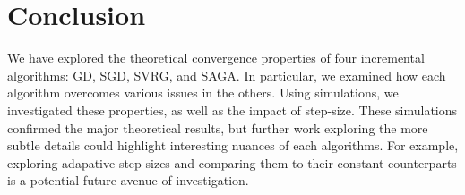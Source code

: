 \section{Conclusion}

We have explored the theoretical convergence properties of four incremental algorithms: GD, SGD, SVRG, and SAGA. In particular, we examined how each algorithm overcomes various issues in the others. Using simulations, we investigated these properties, as well as the impact of step-size. These simulations confirmed the major theoretical results, but further work exploring the more subtle details could highlight interesting nuances of each algorithms. For example, exploring adapative step-sizes and comparing them to their constant counterparts is a potential future avenue of investigation.